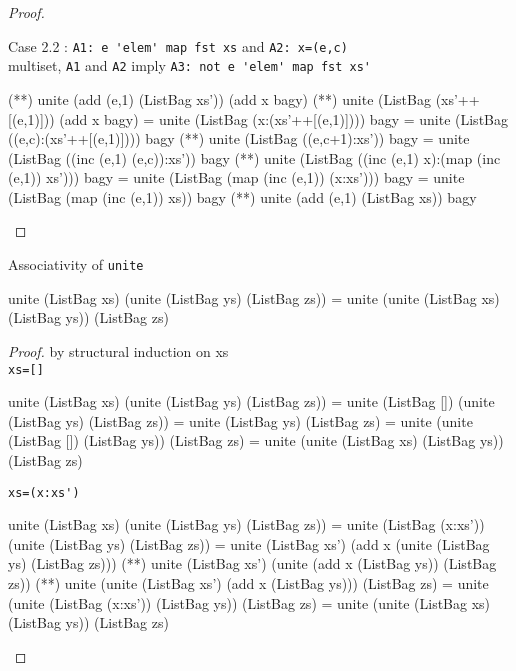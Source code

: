\begin{proof}
\begin{code}
\end{code}
\hspace{1cm}Case 2.2 : \verb|A1: e 'elem' map fst xs| and \verb|A2: x=(e,c)|\\
multiset, \verb|A1| and \verb|A2| imply \verb|A3: not e 'elem' map fst xs'|
\begin{code}
             (**) unite (add (e,1) (ListBag xs')) (add x bagy)
             (**) unite (ListBag (xs'++[(e,1)])) (add x bagy)
             = unite (ListBag (x:(xs'++[(e,1)]))) bagy
             = unite (ListBag ((e,c):(xs'++[(e,1)]))) bagy
             (**) unite (ListBag ((e,c+1):xs')) bagy
             = unite (ListBag ((inc (e,1) (e,c)):xs')) bagy
             (**) unite (ListBag ((inc (e,1) x):(map (inc (e,1)) xs'))) bagy
             = unite (ListBag (map (inc (e,1)) (x:xs'))) bagy
             = unite (ListBag (map (inc (e,1)) xs)) bagy
             (**) unite (add (e,1) (ListBag xs)) bagy
\end{code}
\end{proof}
\begin{lemma}{Associativity of \verb|unite|}
\begin{code}
unite (ListBag xs) (unite (ListBag ys) (ListBag zs))
             = unite (unite (ListBag xs) (ListBag ys)) (ListBag zs)
\end{code}
\end{lemma}
\begin{proof}by structural induction on xs\\
\verb|xs=[]|
\begin{code}
unite (ListBag xs) (unite (ListBag ys) (ListBag zs))
             = unite (ListBag []) (unite (ListBag ys) (ListBag zs))
             = unite (ListBag ys) (ListBag zs)
             = unite (unite (ListBag []) (ListBag ys)) (ListBag zs)
             = unite (unite (ListBag xs) (ListBag ys)) (ListBag zs)
\end{code}
\verb|xs=(x:xs')|
\begin{code}
unite (ListBag xs) (unite (ListBag ys) (ListBag zs))
             = unite (ListBag (x:xs')) (unite (ListBag ys) (ListBag zs))
             = unite (ListBag xs') (add x (unite (ListBag ys) (ListBag zs)))
             (**) unite (ListBag xs') (unite (add x (ListBag ys)) (ListBag zs))
             (**) unite (unite (ListBag xs') (add x (ListBag ys))) (ListBag zs)
             = unite (unite (ListBag (x:xs')) (ListBag ys)) (ListBag zs)
             = unite (unite (ListBag xs) (ListBag ys)) (ListBag zs)
\end{code}
\end{proof}
